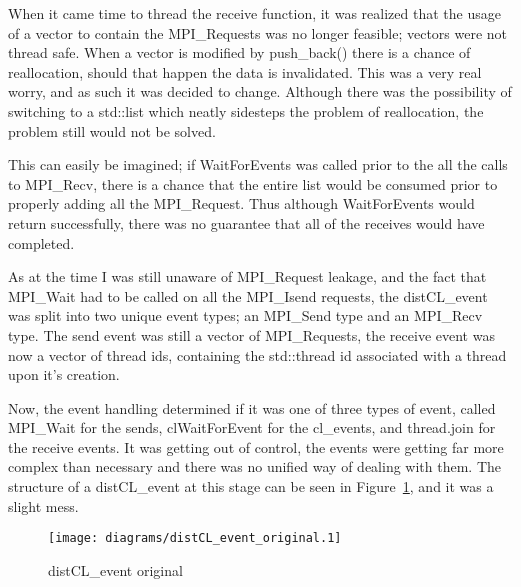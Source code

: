 \documentclass[../thesis.tex]{subfiles}
\begin{document}
            When it came time to thread the receive function, it was realized that the usage of a vector to contain the MPI\_Requests was no longer feasible; vectors were not thread safe. When a vector is modified by push\_back() there is a chance of reallocation, should that happen the data is invalidated. This was a very real worry, and as such it was decided to change. Although there was the possibility of switching to a std::list which neatly sidesteps the problem of reallocation, the problem still would not be solved.

            This can easily be imagined; if WaitForEvents was called prior to the all the calls to MPI\_Recv, there is a chance that the entire list would be consumed prior to properly adding all the MPI\_Request. Thus although WaitForEvents would return successfully, there was no guarantee that all of the receives would have completed.

            As at the time I was still unaware of MPI\_Request leakage, and the fact that MPI\_Wait had to be called on all the MPI\_Isend requests, the distCL\_event was split into two unique event types; an MPI\_Send type and an MPI\_Recv type. The send event was still a vector of MPI\_Requests, the receive event was now a vector of thread ids, containing the std::thread id associated with a thread upon it's creation.

            Now, the event handling determined if it was one of three types of event, called MPI\_Wait for the sends, clWaitForEvent for the cl\_events, and thread.join for the receive events. It was getting out of control, the events were getting far more complex than necessary and there was no unified way of dealing with them. The structure of a distCL\_event at this stage can be seen in Figure~\ref{fig:distCL_event_uml_original}, and it was a slight mess.

            \begin{figure}[htbp]
                \centering
                \texttt{[image: diagrams/distCL\_event\_original.1]}
                \caption{distCL\_event original}
                \label{fig:distCL_event_uml_original}
            \end{figure}
            
        
\end{document}
